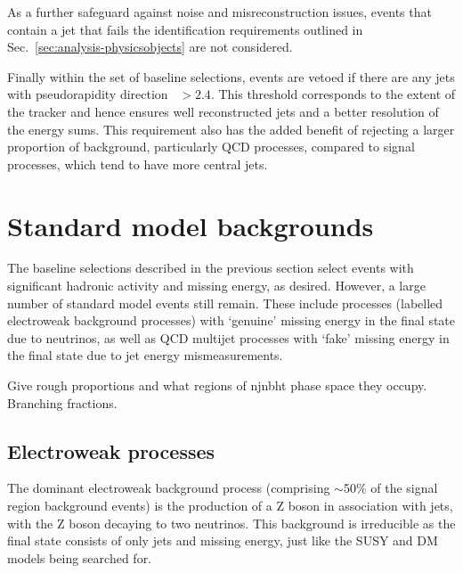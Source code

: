 As a further safeguard against noise and misreconstruction issues, events that 
contain a jet that fails the identification requirements outlined in 
Sec.~\ref{sec:analysis-physicsobjects} are not considered.

Finally within the set of baseline selections, events are vetoed if there are 
any jets with pseudorapidity direction \etaabs~$>2.4$. This threshold 
corresponds to the extent of the tracker and hence ensures well reconstructed 
jets and a better resolution of the energy sums. This requirement also has the 
added benefit of rejecting a larger proportion of background, particularly QCD 
processes, compared to signal processes, which tend to have more central 
jets.

\section{Standard model backgrounds}

The baseline selections described in the previous section select events with 
significant hadronic activity and missing energy, as desired. However, a large 
number of standard model events still remain. These include processes (labelled 
electroweak background processes) with `genuine' missing energy in the final 
state due to neutrinos, as well as QCD multijet processes with `fake' missing 
energy in the final state due to jet energy mismeasurements.

Give rough proportions and what regions of njnbht phase space they occupy. 
Branching fractions.

\subsection{Electroweak processes}

The dominant electroweak background process (comprising $\sim$50\% of the 
signal region background events) is the production of a Z boson in 
association with jets, with the Z boson decaying to two neutrinos. This 
background is irreducible as the final state consists of only jets and missing 
energy, just like the SUSY and DM models being searched for.

